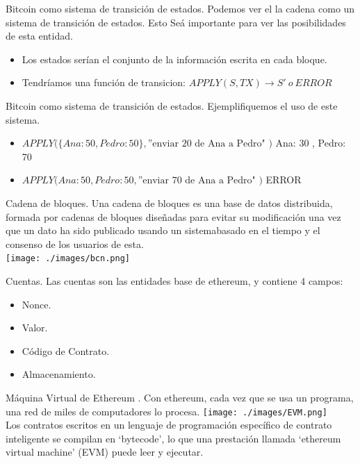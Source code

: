 \documentclass[usenames,dvipsnames]{beamer}
\begin{document}
\begin{frame}{ Bitcoin como sistema de transición de estados. }
Podemos ver el la cadena como un sistema de transición de estados. Esto Seá importante para ver las posibilidades de esta entidad.
\begin{itemize}
	\item Los estados serían el conjunto de la información escrita en cada bloque.
  	\item Tendríamos una  función de transicion: $ APPLY( S , TX ) \to S'\ o\ ERROR$
\end{itemize}
\end{frame}


\begin{frame}{ Bitcoin como sistema de transición de estados. }
Ejemplifiquemos el uso de este sistema.
\begin{itemize}
	\item $ APPLY( \{ Ana: 50 , Pedro: 50 \} , \text{''enviar 20 de Ana a Pedro" )} $
  { Ana: 30 , Pedro: 70 }
  \item  $  APPLY( { Ana: 50 , Pedro: 50 } , \text{''enviar 70 de Ana a Pedro" )} $
  ERROR
\end{itemize}
\end{frame}


\begin{frame} {Cadena de bloques.}
Una cadena de bloques es una base de datos distribuida, formada por cadenas de bloques
diseñadas para evitar su modificación una vez que un dato ha sido publicado usando un sistemabasado en el tiempo y el consenso de los usuarios de esta.\\
\vspace{0.3cm}
\texttt{[image: ./images/bcn.png]}
\end{frame}

\begin{frame}{ Cuentas. }
	Las cuentas son las entidades base de ethereum, y contiene 4 campos:
	\begin{itemize}
	\item Nonce.
	\item Valor.
	\item Código de Contrato.
	\item Almacenamiento.
	\end{itemize}
\end{frame}


\begin{frame}{ Máquina Virtual de Ethereum . }
Con ethereum, cada vez que se usa un programa, una red de miles de computadores lo procesa. 
\texttt{[image: ./images/EVM.png]}\\Los contratos escritos en un lenguaje de programación específico de contrato inteligente se compilan en ‘bytecode’, lo que una prestación llamada ‘ethereum virtual machine’ (EVM) puede leer y ejecutar.
\end{frame}
\end{document}
